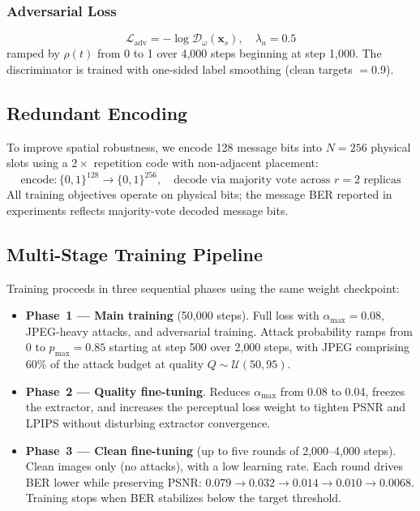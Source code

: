 \documentclass[journal]{IEEEtran}
\newcommand{\Lcal}{\mathcal{L}}
\newcommand{\Ucal}{\mathcal{U}}
\begin{document}
\subsubsection{Adversarial Loss}
\begin{equation}
    \Lcal_\text{adv} = -\log\mathcal{D}_\omega(\mathbf{x}_s),
    \quad \lambda_a = 0.5
    \label{eq:loss_adv}
\end{equation}
ramped by $\rho(t)$ from 0 to 1 over 4{,}000 steps beginning at step 1{,}000.
The discriminator is trained with one-sided label smoothing (clean targets $=0.9$).

\subsection{Redundant Encoding}
\label{sec:redundant}

To improve spatial robustness, we encode 128 message bits into $N=256$ physical slots using
a $2\times$ repetition code with non-adjacent placement:
\begin{equation}
    \text{encode}:\{0,1\}^{128}\to\{0,1\}^{256},\quad
    \text{decode via majority vote across }r=2\text{ replicas}
    \label{eq:redundant}
\end{equation}
All training objectives operate on physical bits; the message BER reported in experiments
reflects majority-vote decoded message bits.

\subsection{Multi-Stage Training Pipeline}
\label{sec:training_pipeline}

Training proceeds in three sequential phases using the same weight checkpoint:

\begin{itemize}[itemsep=2pt,topsep=2pt]
    \item \textbf{Phase~1 --- Main training} (50{,}000 steps).
          Full loss with $\alpha_\text{max}=0.08$, JPEG-heavy attacks, and adversarial training.
          Attack probability ramps from 0 to $p_\text{max}=0.85$ starting at step 500
          over 2{,}000 steps, with JPEG comprising 60\% of the attack budget
          at quality $Q\sim\Ucal(50,95)$.

    \item \textbf{Phase~2 --- Quality fine-tuning}.
          Reduces $\alpha_\text{max}$ from 0.08 to 0.04, freezes the extractor, and increases
          the perceptual loss weight to tighten PSNR and LPIPS without disturbing extractor
          convergence.

    \item \textbf{Phase~3 --- Clean fine-tuning} (up to five rounds of 2{,}000--4{,}000 steps).
          Clean images only (no attacks), with a low learning rate.
          Each round drives BER lower while preserving PSNR:
          $0.079\to0.032\to0.014\to0.010\to0.0068$.
          Training stops when BER stabilizes below the target threshold.
\end{itemize}
\end{document}
